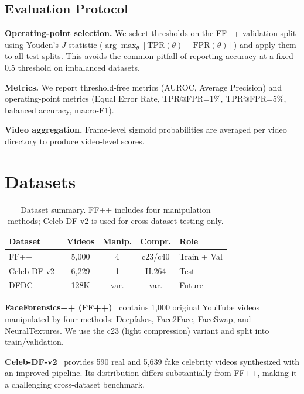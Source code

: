 \documentclass[conference]{IEEEtran}
\begin{document}
\subsection{Evaluation Protocol}
\textbf{Operating-point selection.}
We select thresholds on the FF++ validation split using Youden's $J$ statistic ($\arg\max_\theta [\text{TPR}(\theta) - \text{FPR}(\theta)]$) and apply them to all test splits. This avoids the common pitfall of reporting accuracy at a fixed 0.5 threshold on imbalanced datasets.

\textbf{Metrics.}
We report threshold-free metrics (AUROC, Average Precision) and operating-point metrics (Equal Error Rate, TPR@FPR=1\%, TPR@FPR=5\%, balanced accuracy, macro-F1).

\textbf{Video aggregation.}
Frame-level sigmoid probabilities are averaged per video directory to produce video-level scores.

\section{Datasets}

\begin{table}[t]
\centering
\caption{Dataset summary. FF++ includes four manipulation methods; Celeb-DF-v2 is used for cross-dataset testing only.}
\label{tab:datasets}
\begin{tabular}{lcccl}
\toprule
\textbf{Dataset} & \textbf{Videos} & \textbf{Manip.} & \textbf{Compr.} & \textbf{Role} \\
\midrule
FF++~\cite{rossler2019faceforensics} & 5,000 & 4 & c23/c40 & Train + Val \\
Celeb-DF-v2~\cite{li2020celebdf} & 6,229 & 1 & H.264 & Test \\
DFDC~\cite{dolhansky2020dfdc} & 128K & var. & var. & Future \\
\bottomrule
\end{tabular}
\end{table}

\textbf{FaceForensics++ (FF++)}~\cite{rossler2019faceforensics} contains 1,000 original YouTube videos manipulated by four methods: Deepfakes, Face2Face, FaceSwap, and NeuralTextures. We use the c23 (light compression) variant and split into train/validation.

\textbf{Celeb-DF-v2}~\cite{li2020celebdf} provides 590 real and 5,639 fake celebrity videos synthesized with an improved pipeline. Its distribution differs substantially from FF++, making it a challenging cross-dataset benchmark.
\end{document}
